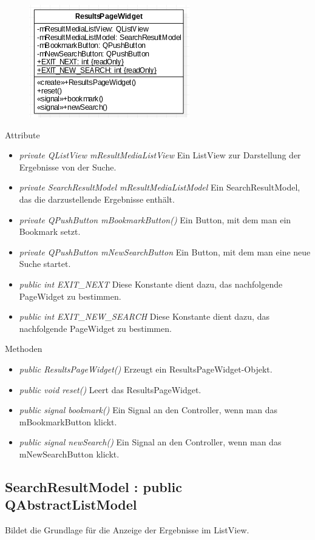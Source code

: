 \begin{figure}[H]
	\centering
	\includegraphics[scale=0.5]{img/Klassendiagramm/Klassen/View/ResultsPageWidget}
	\label{fig:resultsPageWidget}
\end{figure}
\pagebreak
Attribute
\begin{itemize}
	\item\textit{private QListView mResultMediaListView}
	Ein ListView zur Darstellung der Ergebnisse von der Suche.
	\item\textit{private SearchResultModel mResultMediaListModel}
	Ein SearchResultModel, das die darzustellende Ergebnisse enthält.
	\item\textit{private QPushButton mBookmarkButton()}
	Ein Button, mit dem man ein Bookmark setzt.
	\item\textit{private QPushButton mNewSearchButton}
	Ein Button, mit dem man eine neue Suche startet.
	\item\textit{public int EXIT\_NEXT}  
	Diese Konstante dient dazu, das nachfolgende PageWidget zu bestimmen.
	\item\textit{public int EXIT\_NEW\_SEARCH}
	Diese Konstante dient dazu, das nachfolgende PageWidget zu bestimmen.  
\end{itemize}

Methoden
\begin{itemize}
	\item\textit{public ResultsPageWidget()}
	Erzeugt ein ResultsPageWidget-Objekt.
	\item\textit{public void reset()}
	Leert das ResultsPageWidget.
	\item\textit{public signal bookmark()}
	Ein Signal an den Controller, wenn man das mBookmarkButton klickt.
	\item\textit{public signal newSearch()}
	Ein Signal an den Controller, wenn man das mNewSearchButton klickt.
\end{itemize}

\subsection*{SearchResultModel : public QAbstractListModel}
Bildet die Grundlage für die Anzeige der Ergebnisse im ListView.

